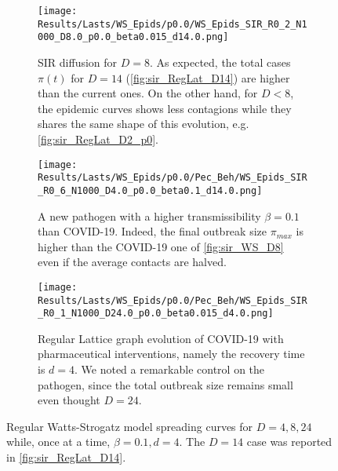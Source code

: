 \documentclass[a4paper,10pt, oneside]{book} %
\theoremstyle{definition}
\begin{document}
\begin{figure}[H]
    \centering
	\begin{subfigure}[t]{.83\linewidth}
        \centering
        \texttt{[image: Results/Lasts/WS\_Epids/p0.0/WS\_Epids\_SIR\_R0\_2\_N1000\_D8.0\_p0.0\_beta0.015\_d14.0.png]} 
        \caption{SIR diffusion for $ D = 8$. As expected, the total cases $ \pi(t)$ for $ D = 14$   (\autoref{fig:sir_RegLat_D14}) are higher than the current ones. On the other hand, for $ D < 8$, the epidemic curves shows less contagions while they shares the same shape of this evolution, e.g. \autoref{fig:sir_RegLat_D2_p0}.} 
		\label{fig:sir_WS_D8}
	\end{subfigure}
	\vfill
    \begin{subfigure}[t]{.83\linewidth}
        \centering
        \texttt{[image: Results/Lasts/WS\_Epids/p0.0/Pec\_Beh/WS\_Epids\_SIR\_R0\_6\_N1000\_D4.0\_p0.0\_beta0.1\_d14.0.png]} 
        \caption{A new pathogen with a higher transmissibility $ \beta = 0.1$ than COVID-19. Indeed, the final outbreak size $\pi_{max} $ is higher than the COVID-19 one of \autoref{fig:sir_WS_D8} even if the average contacts are halved.} 
		\label{fig:sir_WS_D4_b0.1}
    \end{subfigure}
	\vfill
    \begin{subfigure}[t]{.83\linewidth}
        \centering
        \texttt{[image: Results/Lasts/WS\_Epids/p0.0/Pec\_Beh/WS\_Epids\_SIR\_R0\_1\_N1000\_D24.0\_p0.0\_beta0.015\_d4.0.png]} 
        \caption{Regular Lattice graph evolution of COVID-19 with pharmaceutical interventions, namely the recovery time is $ d = 4$. We noted a remarkable control on the pathogen, since the total outbreak size remains small even thought $ D = 24$.} 
		\label{fig:sir_WS_D24_d4}
    \end{subfigure}
    \caption{Regular Watts-Strogatz model spreading curves for $D = 4, 8, 24$ while, once at a time, $ \beta = 0.1, d = 4$. The $ D = 14$ case was reported in \autoref{fig:sir_RegLat_D14}.}
	\label{fig:sir_WS_D5D5b0.1_D24d4}
\end{figure}

\clearpage
{}
\thispagestyle{empty}
\end{document}

